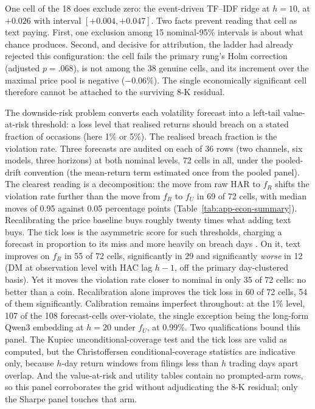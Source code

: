 One cell of the 18 does exclude zero: the event-driven TF--IDF ridge at $h{=}10$, at $+0.026$ with interval $[+0.004, +0.047]$. %
Two facts prevent reading that cell as text paying. First, one exclusion among 15 nominal-95\% intervals is about what chance produces. Second, and decisive for attribution, the ladder had already rejected this configuration: the cell fails the primary rung's Holm correction (adjusted $p = .068$), is not among the 38 genuine cells, and its increment over the maximal price pool is negative ($-0.06\%$). %
The single economically significant cell therefore cannot be attached to the surviving 8-K residual.

The downside-risk problem converts each volatility forecast into a left-tail value-at-risk threshold: a loss level that realised returns should breach on a stated fraction of occasions (here 1\% or 5\%). The realised breach fraction is the violation rate. Three forecasts are audited on each of 36 rows (two channels, six models, three horizons) at both nominal levels, 72 cells in all, under the pooled-drift convention (the mean-return term estimated once from the pooled panel). %
The clearest reading is a decomposition: the move from raw HAR to $f_R$ shifts the violation rate further than the move from $f_R$ to $f_U$ in 69 of 72 cells, with median moves of 0.95 against 0.05 percentage points (Table~\ref{tab:app-econ-summary}). Recalibrating the price baseline buys roughly twenty times what adding text buys. %
The tick loss is the asymmetric score for such thresholds, charging a forecast in proportion to its miss and more heavily on breach days \cite{gonzalezrivera2004forecasting}. On it, text improves on $f_R$ in 55 of 72 cells, significantly in 29 and significantly \emph{worse} in 12 (DM at observation level with HAC lag $h-1$, off the primary day-clustered basis). %
Yet it moves the violation rate closer to nominal in only 35 of 72 cells: no better than a coin. %
Recalibration alone improves the tick loss in 60 of 72 cells, 54 of them significantly. %
Calibration remains imperfect throughout: at the 1\% level, 107 of the 108 forecast-cells over-violate, the single exception being the long-form Qwen3 embedding at $h{=}20$ under $f_U$, at 0.99\%. %
Two qualifications bound this panel. The Kupiec unconditional-coverage test \cite{kupiec1995techniques} and the tick loss are valid as computed, but the Christoffersen conditional-coverage statistics \cite{christoffersen1998evaluating} are indicative only, because $h$-day return windows from filings less than $h$ trading days apart overlap. %
And the value-at-risk and utility tables contain no prompted-arm rows, so this panel corroborates the grid without adjudicating the 8-K residual; only the Sharpe panel touches that arm. %

